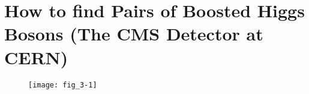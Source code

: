 \chapter{How to find Pairs of Boosted Higgs Bosons (The CMS Detector at CERN)}
\label{chap:three}

\sect{\lipsum*[20][1]}

\subsect{\lipsum*[20][2]}

\lipsum[1-3]

\subsect{\lipsum*[20][3]}

\lipsum[4-5]

\subsect{\lipsum*[20][4]}

\lipsum[7-8]

\subsect{\lipsum*[20][5]}

\lipsum[10-12]

\begin{figure}[tb]
   \centering
   \texttt{[image: fig\_3-1]}
   \caption[{\lipsum*[31][1]}]{\lipsum*[31][1-5]}
   \label{fig:fig_3-1}
\end{figure}

\sect{\lipsum*[21][1]}

\subsect{\lipsum*[21][2]}

\lipsum[13]

\subsect{\lipsum*[21][3]}

\lipsum[14-15]

\subsect{\lipsum*[21][4]}

\lipsum[16-17]

\subsect{\lipsum*[21][5]}

\lipsum[18]

\subsect{\lipsum*[21][6]}

\lipsum[19-20]

\subsect{\lipsum*[21][7]}

\lipsum[21]

\subsect{\lipsum*[21][8]}

\lipsum[22]

\subsect{\lipsum*[21][9]}

\lipsum[23-24]

\subsect{\lipsum*[21][10]}

\lipsum[25-26]

\subsect{\lipsum*[21][11]}

\lipsum[27-28]

\subsect{\lipsum*[21][12]}

